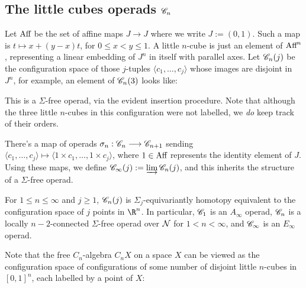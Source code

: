 \documentclass[11pt]{article}
\newcommand{\Aff}{\textup{Aff}}
\newcommand{\labsq}[6][0]{
\draw (#2+#1,#3)--(#4+#1,#3)--(#4+#1,#5)--(#2+#1,#5)-- cycle;
\path (.5*#2+.5*#4+#1,.5*#3+.5*#5) node[font=\scriptsize] {#6};
}
\begin{document}
\begin{chapter4-6}
\setcounter{section}{3}
\section{The little cubes operads \texorpdfstring{$\mathscr{C}_n$}{Cn}}
Let $\Aff$ be the set of affine maps $J\to J$ where we write $J:=(0,1)$. Such a map is $t\mapsto x+(y-x)t$, for $0\leq x<y\leq1$. A little $n$-cube is just an element of $\Aff^n$, representing a linear embedding of $J^n$ in itself with parallel axes. Let $\mathscr{C}_n(j)$ be the configuration space of those $j$-tuples $\langle c_1,\ldots,c_j\rangle$ whose images are disjoint in $J^n$, for example, an element of $\mathscr{C}_n(3)$ looks like:
\begin{center}
\end{center}
This is a $\Sigma$-free operad, via the evident insertion procedure. Note that although the three little $n$-cubes in this configuration were not labelled, we \emph{do} keep track of their orders.

There's a map of operads $\sigma_{n}:\mathscr{C}_n\longrightarrow\mathscr{C}_{n+1}$ sending $\langle c_1,\ldots,c_j\rangle\mapsto\langle 1\times c_1,\ldots,1\times c_j\rangle$, where $1\in\Aff$ represents the identity element of $J$. Using these maps, we define $\mathscr{C}_\infty(j):=\varinjlim\mathscr{C}_n(j)$, and this inherits the structure of a $\Sigma$-free operad.
\begin{thm*}[4.8]
For $1\leq n\leq\infty$ and $j\geq1$, $\mathscr{C}_n(j)$ is $\Sigma_j$-equivariantly homotopy equivalent to the configuration space of $j$ points in $\R^n$. In particular, $\mathscr{C}_1$ is an $A_\infty$ operad, $\mathscr{C}_n$ is a locally $n-2$-connected $\Sigma$-free operad over $\mathcal{N}$ for $1<n<\infty$, and $\mathscr{C}_\infty$ is an $E_\infty$ operad.
\end{thm*}

Note that the free $C_n$-algebra $C_nX$ on a space $X$ can be viewed as the configuration space of configurations of some number of disjoint little $n$-cubes in $[0,1]^n$, each labelled by a point of $X$:
\begin{center}
\end{center}
\end{chapter4-6}
\end{document}
